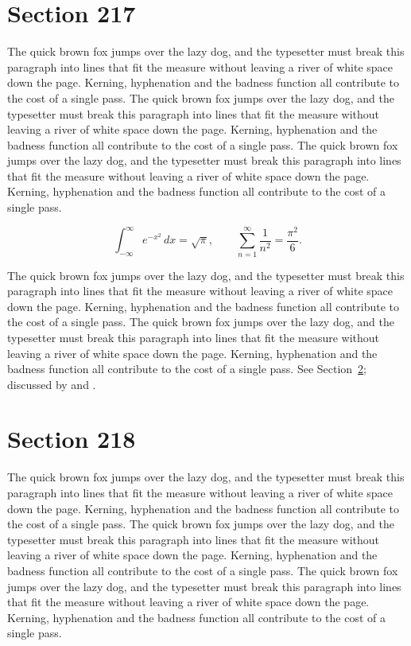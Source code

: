 \documentclass{article}
\begin{document}
\section{Section 217}
\label{sec:217}
The quick brown fox jumps over the lazy dog, and the typesetter must break this paragraph into lines that fit the measure without leaving a river of white space down the page. Kerning, hyphenation and the badness function all contribute to the cost of a single pass. The quick brown fox jumps over the lazy dog, and the typesetter must break this paragraph into lines that fit the measure without leaving a river of white space down the page. Kerning, hyphenation and the badness function all contribute to the cost of a single pass. The quick brown fox jumps over the lazy dog, and the typesetter must break this paragraph into lines that fit the measure without leaving a river of white space down the page. Kerning, hyphenation and the badness function all contribute to the cost of a single pass. 

\begin{equation}\label{eq:217}
\int_{-\infty}^{\infty} e^{-x^{2}}\,dx = \sqrt{\pi}, \qquad
\sum_{n=1}^{\infty} \frac{1}{n^{2}} = \frac{\pi^{2}}{6}.
\end{equation}

The quick brown fox jumps over the lazy dog, and the typesetter must break this paragraph into lines that fit the measure without leaving a river of white space down the page. Kerning, hyphenation and the badness function all contribute to the cost of a single pass. The quick brown fox jumps over the lazy dog, and the typesetter must break this paragraph into lines that fit the measure without leaving a river of white space down the page. Kerning, hyphenation and the badness function all contribute to the cost of a single pass. 
See Section~\ref{sec:218}; discussed by \textcite{k3} and \textcite{l5}.
\section{Section 218}
\label{sec:218}
The quick brown fox jumps over the lazy dog, and the typesetter must break this paragraph into lines that fit the measure without leaving a river of white space down the page. Kerning, hyphenation and the badness function all contribute to the cost of a single pass. The quick brown fox jumps over the lazy dog, and the typesetter must break this paragraph into lines that fit the measure without leaving a river of white space down the page. Kerning, hyphenation and the badness function all contribute to the cost of a single pass. The quick brown fox jumps over the lazy dog, and the typesetter must break this paragraph into lines that fit the measure without leaving a river of white space down the page. Kerning, hyphenation and the badness function all contribute to the cost of a single pass. 
\end{document}
